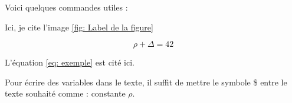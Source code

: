 \documentclass{rapportECL}
\begin{document}
Voici quelques commandes utiles :



Ici, je cite l'image \ref{fig: Label de la figure}



\begin{equation} \label{eq: exemple}
\rho + \Delta = 42
\end{equation}

L'équation \ref{eq: exemple} est cité ici. 


Pour écrire des variables dans le texte, il suffit de mettre le symbole \$ entre le texte souhaité comme : constante $\rho$. 
\end{document}
